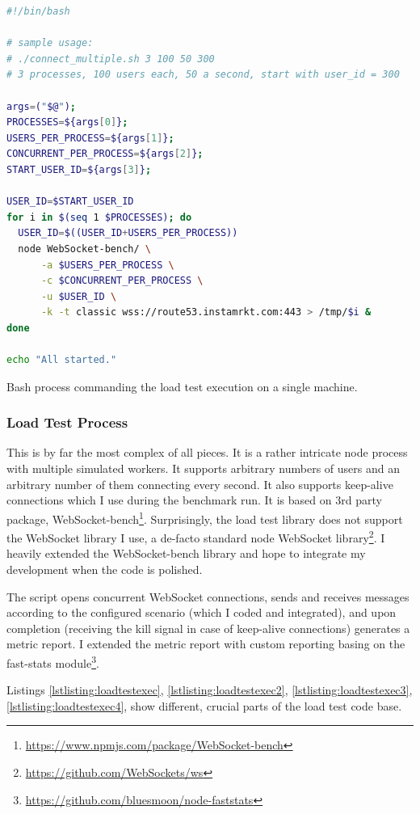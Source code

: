 \documentclass{uvamscse}
\begin{document}
\begin{sourcecode}[H]
\begin{lstlisting}[style=mono, language=bash]
#!/bin/bash

# sample usage:
# ./connect_multiple.sh 3 100 50 300
# 3 processes, 100 users each, 50 a second, start with user_id = 300

args=("$@");
PROCESSES=${args[0]};
USERS_PER_PROCESS=${args[1]};
CONCURRENT_PER_PROCESS=${args[2]};
START_USER_ID=${args[3]};

USER_ID=$START_USER_ID
for i in $(seq 1 $PROCESSES); do
  USER_ID=$((USER_ID+USERS_PER_PROCESS))
  node WebSocket-bench/ \
      -a $USERS_PER_PROCESS \
      -c $CONCURRENT_PER_PROCESS \
      -u $USER_ID \
      -k -t classic wss://route53.instamrkt.com:443 > /tmp/$i &
done

echo "All started."

\end{lstlisting}
\caption{Bash process commanding the load test execution on a single machine.}
\label{lstlisting:bashloadtest}
\end{sourcecode}


\subsubsection{Load Test Process}
This is by far the most complex of all pieces. It is a rather intricate node process with multiple simulated workers. It supports arbitrary numbers of users and an arbitrary number of them connecting every second. It also supports keep-alive connections which I use during the benchmark run. It is based on 3rd party package, WebSocket-bench\footnote{\url{https://www.npmjs.com/package/WebSocket-bench}}. Surprisingly, the load test library does not support the WebSocket library I use, a de-facto standard node WebSocket library\footnote{\url{https://github.com/WebSockets/ws}}. I heavily extended the WebSocket-bench library and hope to integrate my development when the code is polished.

The script opens concurrent WebSocket connections, sends and receives messages according to the configured scenario (which I coded and integrated), and upon completion (receiving the kill signal in case of keep-alive connections) generates a metric report. I extended the metric report with custom reporting basing on the fast-stats module\footnote{\url{https://github.com/bluesmoon/node-faststats}}.

Listings \ref{lstlisting:loadtestexec}, \ref{lstlisting:loadtestexec2}, \ref{lstlisting:loadtestexec3}, \ref{lstlisting:loadtestexec4},  show different, crucial parts of the load test code base.
\end{document}

